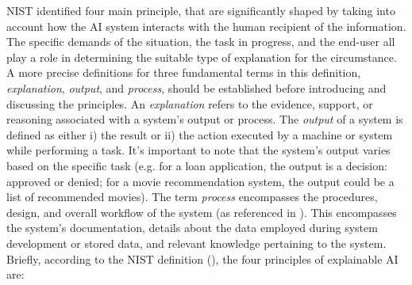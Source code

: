 \documentclass[binding=0.6cm]{sapthesis}
\newcommand{\mycite}[1]{(\cite{#1})}
\begin{document}
NIST identified four main principle, that are significantly shaped by taking into account how the AI system interacts with the human recipient of the information. The specific demands of the situation, the task in progress, and the end-user all play a role in determining the suitable type of explanation for the circumstance. A more precise definitions for three fundamental terms in this definition, \textit{explanation}, \textit{output}, and \textit{process}, should be established before introducing and discussing the principles. An \textit{explanation} refers to the evidence, support, or reasoning associated with a system's output or process. The \textit{output} of a system is defined as either i) the result or ii) the action executed by a machine or system while performing a task. It's important to note that the system's output varies based on the specific task (e.g. for a loan application, the output is a decision: approved or denied; for a movie recommendation system, the output could be a list of recommended movies). The term \textit{process} encompasses the procedures, design, and overall workflow of the system (as referenced in \cite{leslie2021-xai-workbook}). This encompasses the system's documentation, details about the data employed during system development or stored data, and relevant knowledge pertaining to the system. Briefly, according to the NIST definition \mycite{phillips2021-nist-xai}, the four principles of explainable AI are:
\end{document}
